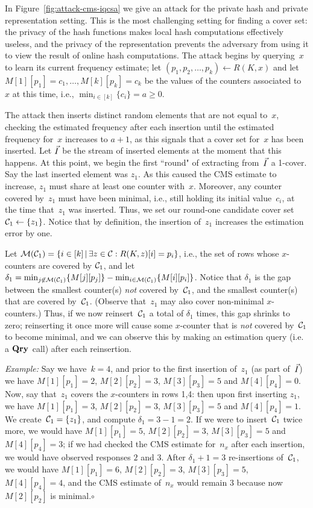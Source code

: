 In Figure~\ref{fig:attack-cms-iqcsa} we give an attack for the private hash and private representation setting.  This is the most challenging setting for finding a cover set: the privacy of the hash functions makes local hash computations effectively useless, and the privacy of the representation prevents the adversary from using it to view the result of online hash computations.  The attack begins by querying~$x$ to learn its current frequency estimate; let $(p_1,p_2,\ldots,p_k) \gets R(K,x)$ and let $M[1][p_1]=c_1,\ldots,M[k][p_k]=c_k$ be the values of the counters associated to~$x$ at this time, i.e., $\min_{i\in[k]}\{c_i\}=a \geq 0$. 

The attack then inserts distinct random elements that are not equal to~$x$, checking the estimated frequency after each insertion until the estimated frequency for~$x$ increases to $a+1$, as this signals that a cover set for~$x$ has been inserted. Let $\vec{I}$ be the stream of inserted elements at the moment that this happens.  At this point, we begin the first ``round" of extracting from~$\vec{I}$ a 1-cover.  Say the last inserted element was $z_1$. As this caused the CMS estimate to increase, $z_1$ must share at least one counter with~$x$.  Moreover, any counter covered by~$z_1$ must have been minimal, i.e., still holding its initial value~$c_i$, at the time that~$z_1$ was inserted.  Thus, we set our round-one candidate cover set~$\mathcal{C}_1\gets\{z_1\}$.  Notice that by definition, the insertion of~$z_1$ increases the estimation error by one.

Let $\mathcal{M}(\mathcal{C}_1)=\{i \in [k] \,|\, \exists z \in \mathcal{C}: R(K,z)[i]=p_i\}$, i.e., the set of rows whose $x$-counters are covered by $\mathcal{C}_1$, and let $\delta_1 = \min_{j \not\in \mathcal{M}(\mathcal{C}_1)}\{M[j][p_j]\} - \min_{i \in \mathcal{M}(\mathcal{C}_1)}\{M[i][p_i]\}$.  Notice that $\delta_1$ is the gap between the smallest counter(s) \emph{not} covered by~$\mathcal{C}_1$, and the smallest counter(s) that are covered by~$\mathcal{C}_1$.  (Observe that~$z_1$ may also cover non-minimal $x$-counters.)  Thus, if we now reinsert~$\mathcal{C}_1$ a total of $\delta_1$ times, this gap shrinks to zero; reinserting it once more will cause some $x$-counter that is \emph{not} covered by~$\mathcal{C}_1$ to become minimal, and we can observe this by making an estimation query (i.e. a $\textup{\textbf{Qry}}\hspace{0.5pt}$ call) after each reinsertion.  

\noindent\textit{Example: }
Say we have~$k=4$, and prior to the first insertion of~$z_1$ (as part of~$\vec{I}$) we have $M[1][p_1]=2$, $M[2][p_2]=3$, $M[3][p_3]=5$ and $M[4][p_4]=0$. Now, say that~$z_1$ covers the $x$-counters in rows 1,4: then upon first inserting $z_1$, we have $M[1][p_1]=3$, $M[2][p_2]=3$, $M[3][p_3]=5$ and $M[4][p_4]=1$.  We create~$\mathcal{C}_1=\{z_1\}$, and compute $\delta_1 = 3-1=2$.  If we were to insert~$\mathcal{C}_1$ twice more, we would have $M[1][p_1]=5$, $M[2][p_2]=3$, $M[3][p_3]=5$ and $M[4][p_4]=3$; if we had checked the CMS estimate for~$n_x$ after each insertion, we would have observed responses $2$ and $3$.  After $\delta_1+1=3$ re-insertions of~$\mathcal{C}_1$, we would have $M[1][p_1]=6$, $M[2][p_2]=3$, $M[3][p_3]=5$, $M[4][p_4]=4$, and the CMS estimate of~$n_x$ would remain $3$ because now $M[2][p_2]$ is minimal.\hfill$\circ$


